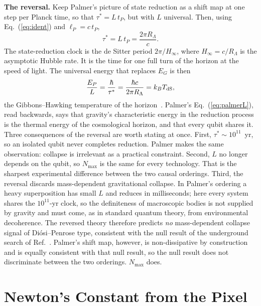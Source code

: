 \documentclass[aps,prd,twocolumn,superscriptaddress,nofootinbib,showkeys]{revtex4-2}
\begin{document}
\textbf{The reversal.} Keep Palmer's picture of state reduction as a shift map at one step per Planck time, so that $\tau^* = L\,t_P$, but with $L$ universal. Then, using Eq.~(\ref{eq:ident}) and $\ell_P = c\,t_P$,
\begin{equation}
\tau^* = L\,t_P = \frac{2\pi R_\Lambda}{c} .
\label{eq:clock}
\end{equation}
The state-reduction clock is the de Sitter period $2\pi/H_\infty$, where $H_\infty = c/R_\Lambda$ is the asymptotic Hubble rate. It is the time for one full turn of the horizon at the speed of light. The universal energy that replaces $E_G$ is then
\begin{equation}
\frac{E_P}{L} = \frac{\hbar}{\tau^*} = \frac{\hbar c}{2\pi R_\Lambda} = k_B T_{\rm dS},
\label{eq:energy}
\end{equation}
the Gibbons--Hawking temperature of the horizon~\cite{gibbons1977}. Palmer's Eq.~(\ref{eq:palmerL}), read backwards, says that gravity's characteristic energy in the reduction process is the thermal energy of the cosmological horizon, and that every qubit shares it. Three consequences of the reversal are worth stating at once. First, $\tau^*\sim10^{11}$~yr, so an isolated qubit never completes reduction. Palmer makes the same observation: collapse is irrelevant as a practical constraint. Second, $L$ no longer depends on the qubit, so $N_{\max}$ is the same for every technology. That is the sharpest experimental difference between the two causal orderings. Third, the reversal discards mass-dependent gravitational collapse. In Palmer's ordering a heavy superposition has small $L$ and reduces in milliseconds; here every system shares the $10^{11}$-yr clock, so the definiteness of macroscopic bodies is not supplied by gravity and must come, as in standard quantum theory, from environmental decoherence. The reversed theory therefore predicts \emph{no} mass-dependent collapse signal of Di\'osi--Penrose type, consistent with the null result of the underground search of Ref.~\cite{donadi2021}. Palmer's shift map, however, is non-dissipative by construction and is equally consistent with that null result, so the null result does not discriminate between the two orderings. $N_{\max}$ does.

\section{Newton's Constant from the Pixel}
\label{sec:pixel}
\end{document}
